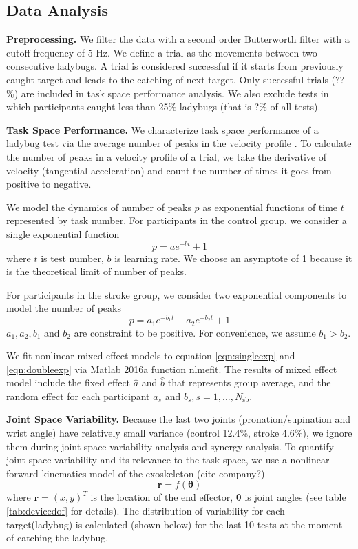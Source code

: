 \subsection{Data Analysis}

\textbf{Preprocessing.}
We filter the data with a second order Butterworth filter with a cutoff frequency of 5 Hz.
We define a trial as the movements between two consecutive ladybugs.
A trial is considered successful if it starts from previously caught target and leads to the catching of next target. Only successful trials (??\%) are included in task space performance analysis. We also exclude tests in which participants caught less than 25\% ladybugs (that is ?\% of all tests).

\textbf{Task Space Performance.}
We characterize task space performance of a ladybug test via the average number of peaks in the velocity profile \cite{}. 
To calculate the number of peaks in a velocity profile of a trial, we take the derivative of velocity (tangential acceleration) and count the number of times it goes from positive to negative.

We model the dynamics of number of peaks $ p $ as exponential functions of time $ t $ represented by task number.
For participants in the control group, we consider a single exponential function
\begin{equation}\label{eqn:singleexp}
p = a e^{-b t} + 1
\end{equation}
where $ t $ is test number, $ b $ is learning rate.
We choose an asymptote of 1 because it is the theoretical limit of number of peaks.

For participants in the stroke group, we consider two exponential components to model the number of peaks
\begin{equation}\label{eqn:doubleexp}
p = a_1 e^{-b_1 t} + a_2 e^{-b_2 t} + 1
\end{equation}
$ a_1, a_2, b_1 $ and $ b_2 $ are constraint to be positive.
For convenience, we assume $ b_1 > b_2 $.

We fit nonlinear mixed effect models \cite{} to equation \ref{eqn:singleexp} and \ref{eqn:doubleexp} via Matlab 2016a function \textsf{nlmefit}.
The results of mixed effect model include the fixed effect $ \hat{a} $ and $ \hat{b} $ that represents group average, and the random effect for each participant $ a_s $ and $ b_s, s = 1, ..., N_\text{sb} $.

\textbf{Joint Space Variability.}
Because the last two joints (pronation/supination and wrist angle) have relatively small variance (control 12.4\%, stroke 4.6\%), we ignore them during joint space variability analysis and synergy analysis.
To quantify joint space variability and its relevance to the task space, we use a nonlinear forward kinematics model of the exoskeleton (cite company?)
	\begin{equation}\label{eqn:nonlinearForwardKinematics}
	\bm{r} = f(\bm{\theta})
	\end{equation}
where $ \bm{r} = (x,y)^T $ is the location of the end effector, $ \bm{\theta} $ is joint angles (see table \ref{tab:devicedof} for details). 
The distribution of variability for each target(ladybug) is calculated (shown below) for the last 10 tests at the moment of catching the ladybug. 

